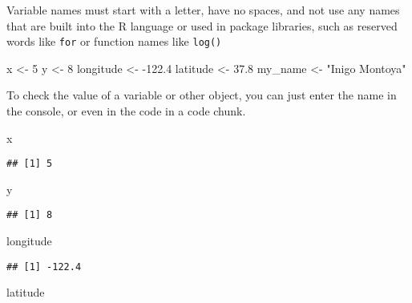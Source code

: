 \documentclass[
]{book}
\newenvironment{Shaded}{\begin{snugshade}}{\end{snugshade}}
\newcommand{\DecValTok}[1]{\textcolor[rgb]{0.00,0.00,0.81}{#1}}
\newcommand{\FloatTok}[1]{\textcolor[rgb]{0.00,0.00,0.81}{#1}}
\newcommand{\NormalTok}[1]{#1}
\newcommand{\StringTok}[1]{\textcolor[rgb]{0.31,0.60,0.02}{#1}}
\begin{document}
\begin{verbatim}
\end{verbatim}

Variable names must start with a letter, have no spaces, and not use any names
that are built into the R language or used in package libraries, such as
reserved words like \texttt{for} or function names like \texttt{log()}

\begin{Shaded}
\begin{Highlighting}[]
\NormalTok{x <-}\StringTok{ }\DecValTok{5}
\NormalTok{y <-}\StringTok{ }\DecValTok{8}
\NormalTok{longitude <-}\StringTok{ }\FloatTok{-122.4}
\NormalTok{latitude <-}\StringTok{ }\FloatTok{37.8}
\NormalTok{my_name <-}\StringTok{ "Inigo Montoya"}
\end{Highlighting}
\end{Shaded}

To check the value of a variable or other object, you can just enter the name in
the console, or even in the code in a code chunk.

\begin{Shaded}
\begin{Highlighting}[]
\NormalTok{x}
\end{Highlighting}
\end{Shaded}

\begin{verbatim}
## [1] 5
\end{verbatim}

\begin{Shaded}
\begin{Highlighting}[]
\NormalTok{y}
\end{Highlighting}
\end{Shaded}

\begin{verbatim}
## [1] 8
\end{verbatim}

\begin{Shaded}
\begin{Highlighting}[]
\NormalTok{longitude}
\end{Highlighting}
\end{Shaded}

\begin{verbatim}
## [1] -122.4
\end{verbatim}

\begin{Shaded}
\begin{Highlighting}[]
\NormalTok{latitude}
\end{Highlighting}
\end{Shaded}
\end{document}
